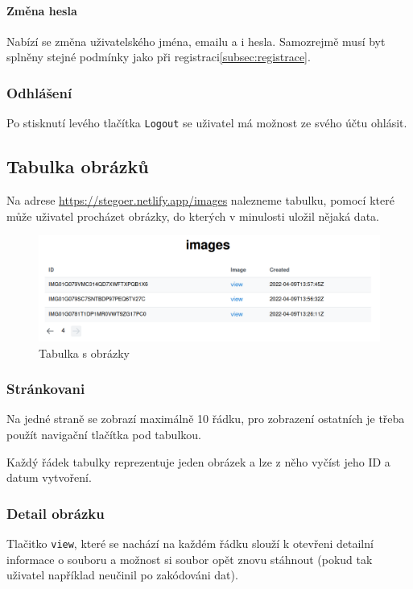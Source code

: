 \paragraph{Změna hesla}

Nabízí se změna uživatelského jména, emailu a i hesla.
Samozrejmě musí byt splněny stejné podmínky jako při
registraci\ref{subsec:registrace}.

\subsubsection{Odhlášení}

Po stisknutí levého tlačítka \texttt{Logout} se uživatel má možnost ze svého
účtu ohlásit.

\subsection{Tabulka obrázků}\label{subsec:tabulka-obrazku}
Na adrese \url{https://stegoer.netlify.app/images} nalezneme tabulku, pomocí
které může uživatel procházet obrázky, do kterých v minulosti uložil nějaká
data.

\begin{figure}
    \centering
    \includegraphics[scale=0.5]{assets/images/images-table}
    \caption{Tabulka s obrázky}\label{fig:tabulka-obrazky}
\end{figure}

\subsubsection{Stránkovani}\label{subsubsec:strankovani}
Na jedné straně se zobrazí maximálně 10 řádku, pro zobrazení ostatních je třeba
použít navigační tlačítka pod tabulkou.

Každý řádek tabulky reprezentuje jeden obrázek a lze z něho vyčíst jeho ID a
datum vytvoření.

\subsubsection{Detail obrázku}\label{subsubsec:detail-obrazku}
Tlačitko \texttt{view}, které se nachází na každém řádku slouží k otevřeni
detailní informace o souboru a možnost si soubor opět znovu stáhnout
(pokud tak uživatel například neučinil po zakódováni dat).

